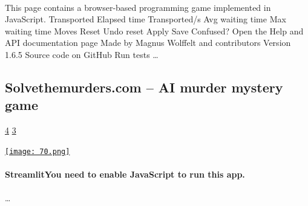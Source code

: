 \documentclass[10pt,a4paper]{article}
\begin{document}
\begin{multicols}{2}
\paragraph{}
 This page contains a browser-based programming game implemented in JavaScript.
Transported
Elapsed time
Transported/s
Avg waiting time
Max waiting time
Moves
Reset
Undo reset
Apply
Save
Confused? Open the
Help and API documentation
page
Made by Magnus Wolffelt and contributors
Version
1.6.5
Source code
on GitHub
Run tests
\dots\par
\noindent\begin{minipage}{\linewidth}
\medskip
\subsection{Solvethemurders.com – AI murder mystery game}
\textsc{\footnotesize
{\scriptsize\faThumbsOUp}\space 
\href{http://news.ycombinator.com/item?id=37293486\&utm\_term=comment}{4} 
{\scriptsize\faComments}\space 
\href{http://news.ycombinator.com/item?id=37293486\&utm\_term=comment}{3} 
}
\par\medskip\noindent
\href{https://solvethemurders.com?utm\_source=hackernewsletter\&utm\_medium=email\&utm\_term=fun}{
    \texttt{[image: 70.png]}
}
\end{minipage}
\paragraph{}
\textbf{StreamlitYou need to enable JavaScript to run this app.}
\paragraph{}

\dots\par
\end{multicols}

\newpage
\end{document}
